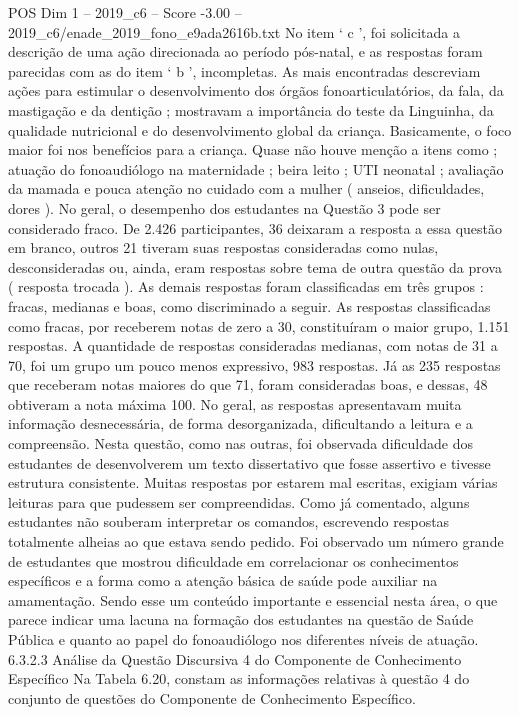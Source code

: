 \begin{textsample}{POS Dim 1 – 2019\_c6 – Score -3.00 – 2019\_c6/enade\_2019\_fono\_e9ada2616b.txt}
No item ‘ c ’, foi solicitada a descrição de uma ação direcionada ao período pós-natal, e as respostas foram parecidas com as do item ‘ b ’, incompletas.
As mais encontradas descreviam ações para estimular o desenvolvimento dos órgãos fonoarticulatórios, da fala, da mastigação e da dentição ; mostravam a importância do teste da Linguinha, da qualidade nutricional e do desenvolvimento global da criança.
Basicamente, o foco maior foi nos benefícios para a criança.
Quase não houve menção a itens como ; atuação do fonoaudiólogo na maternidade ; beira leito ; UTI neonatal ; avaliação da mamada e pouca atenção no cuidado com a mulher ( anseios, dificuldades, dores ).
No geral, o desempenho dos estudantes na Questão 3 pode ser considerado fraco.
De 2.426 participantes, 36 deixaram a resposta a essa questão em branco, outros 21 tiveram suas respostas consideradas como nulas, desconsideradas ou, ainda, eram respostas sobre tema de outra questão da prova ( resposta trocada ).
As demais respostas foram classificadas em três grupos : fracas, medianas e boas, como discriminado a seguir.
As respostas classificadas como fracas, por receberem notas de zero a 30, constituíram o maior grupo, 1.151 respostas.
A quantidade de respostas consideradas medianas, com notas de 31 a 70, foi um grupo um pouco menos expressivo, 983 respostas.
Já as 235 respostas que receberam notas maiores do que 71, foram consideradas boas, e dessas, 48 obtiveram a nota máxima 100.
No geral, as respostas apresentavam muita informação desnecessária, de forma desorganizada, dificultando a leitura e a compreensão.
Nesta questão, como nas outras, foi observada dificuldade dos estudantes de desenvolverem um texto dissertativo que fosse assertivo e tivesse estrutura consistente.
Muitas respostas por estarem mal escritas, exigiam várias leituras para que pudessem ser compreendidas.
Como já comentado, alguns estudantes não souberam interpretar os comandos, escrevendo respostas totalmente alheias ao que estava sendo pedido.
Foi observado um número grande de estudantes que mostrou dificuldade em correlacionar os conhecimentos específicos e a forma como a atenção básica de saúde pode auxiliar na amamentação.
Sendo esse um conteúdo importante e essencial nesta área, o que parece indicar uma lacuna na formação dos estudantes na questão de Saúde Pública e quanto ao papel do fonoaudiólogo nos diferentes níveis de atuação. 6.3.2.3 Análise da Questão Discursiva 4 do Componente de Conhecimento Específico Na Tabela 6.20, constam as informações relativas à questão 4 do conjunto de questões do Componente de Conhecimento Específico.

\end{textsample}
